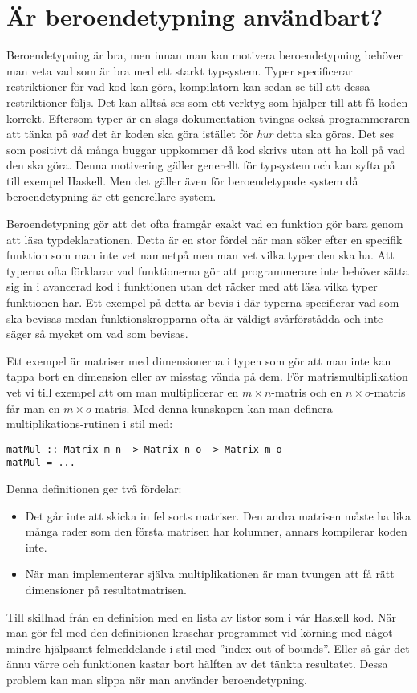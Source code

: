 \section{Är beroendetypning användbart?}
Beroendetypning är bra, men innan man kan motivera beroendetypning behöver man
veta vad som är bra med ett starkt typsystem.
Typer specificerar restriktioner för vad kod kan göra, kompilatorn kan sedan se
till att dessa restriktioner följs. Det kan alltså ses som ett verktyg som
hjälper till att få koden korrekt. Eftersom typer är en slags dokumentation
tvingas också programmeraren att tänka på
\emph{vad} det är koden ska göra istället för \emph{hur} detta ska göras. Det
ses som positivt då många buggar uppkommer då kod skrivs utan att ha koll på
vad den ska göra. Denna motivering gäller generellt för typsystem och kan syfta
på till exempel Haskell. Men det gäller även för beroendetypade system då
beroendetypning är ett generellare system.

Beroendetypning gör att det ofta framgår exakt vad en funktion gör bara genom
att läsa typdeklarationen. Detta är en stor fördel när man söker efter en
specifik funktion som man inte vet namnetpå men man vet vilka typer den ska ha.
Att typerna ofta förklarar vad funktionerna gör att programmerare inte behöver
sätta sig in i avancerad kod i funktionen utan det räcker med att läsa vilka
typer funktionen har. Ett exempel på detta är bevis i \coq{} där typerna
specifierar vad som ska bevisas medan funktionskropparna ofta är väldigt
svårförstådda och inte säger så mycket om vad som bevisas.

Ett exempel är matriser med dimensionerna i typen som gör att man inte kan
tappa bort en dimension eller av misstag vända på dem. För matrismultiplikation
vet vi till exempel att om man multiplicerar en $m \times n$-matris och en
$n \times o$-matris får man en $m \times o$-matris. Med denna kunskapen kan
man definera multiplikations-rutinen i stil med:

\begin{verbatim}
matMul :: Matrix m n -> Matrix n o -> Matrix m o
matMul = ...
\end{verbatim}

Denna definitionen ger två fördelar:

\begin{itemize}
  \item Det går inte att skicka in fel sorts matriser. Den andra matrisen måste
    ha lika många rader som den första matrisen har kolumner, annars kompilerar
    koden inte.
  \item När man implementerar själva multiplikationen är man tvungen att få rätt
    dimensioner på resultatmatrisen.
\end{itemize}

Till skillnad från en definition med en lista av listor som i vår Haskell kod.
När man gör fel med den definitionen kraschar programmet vid körning med något
mindre hjälpsamt felmeddelande i stil med ''index out of bounds''. Eller så går
det ännu värre och funktionen kastar bort hälften av det tänkta resultatet.
Dessa problem kan man slippa när man använder beroendetypning.
